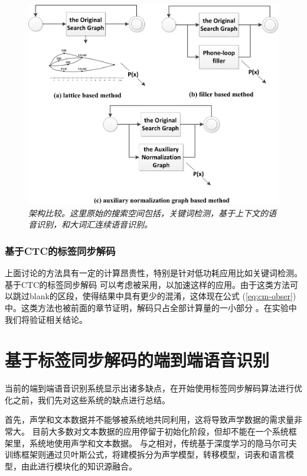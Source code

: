  \begin{figure}[tb]
        \centering
        \includegraphics[width=0.7\linewidth]{figure/graph_example.png}
        \caption{{\it 架构比较。这里原始的搜索空间包括，关键词检测，基于上下文的语音识别，和大词汇连续语音识别。 }}
        \label{fig:graph-example}
\end{figure}

 \subsubsection{基于CTC的标签同步解码}
 \label{Sec:psd-ctc}

上面讨论的方法具有一定的计算昂贵性，特别是针对低功耗应用比如关键词检测。基于CTC的标签同步解码 \cite{Chen+2016} 可以考虑被采用，以加速这样的应用。由于这类方法可以跳过blank的区段，使得结果中具有更少的混淆，这体现在公式 (\ref{eq:cm-obser})中。这类方法也被前面的章节证明，解码只占全部计算量的一小部分 \cite{Chen+2016}\cite{zhc00-chen-tasl2017} 。在实验中我们将验证相关结论。



\section{基于标签同步解码的端到端语音识别}
\label{chap:lsd-e2e}

当前的端到端语音识别系统显示出诸多缺点，在开始使用标签同步解码算法进行优化之前，我们先对这些系统的缺点进行总结。

首先，声学和文本数据并不能够被系统地共同利用，这将导致声学数据的需求量非常大。
目前大多数对文本数据的应用停留于初始化阶段，但却不能在一个系统框架里，系统地使用声学和文本数据。
与之相对，传统基于深度学习的隐马尔可夫训练框架则通过贝叶斯公式，将建模拆分为声学模型，转移模型，词表和语言模型，由此进行模块化的知识源融合。

